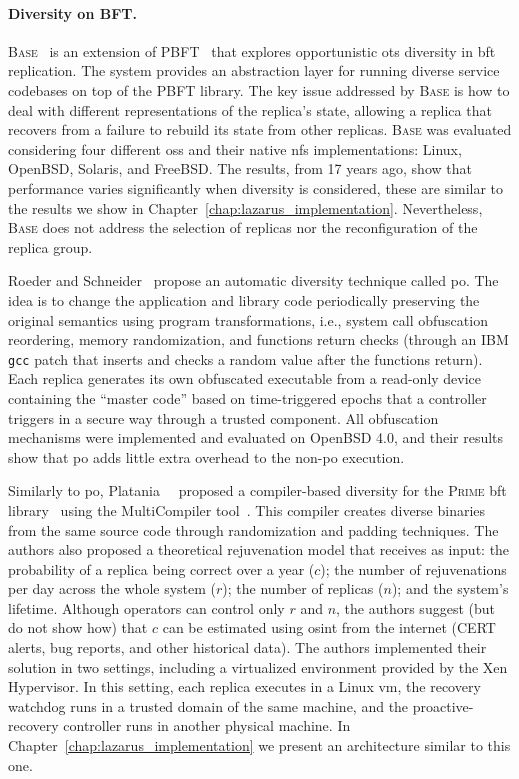 \paragraph{Diversity on BFT.}
\textsc{Base}~\cite{Rodrigues:2001} is an extension of PBFT~\cite{Castro:1999} that explores opportunistic \gls{ots} diversity in \gls{bft} replication. 
The system provides an abstraction layer for running diverse service codebases on top of the PBFT library.
The key issue addressed by \textsc{Base} is how to deal with different representations of the replica's state, allowing a replica that recovers from a failure to rebuild its state from other replicas. 
\textsc{Base} was evaluated considering four different \glspl{os} and their native \gls{nfs} implementations: Linux, OpenBSD, Solaris, and FreeBSD.
The results, from 17 years ago, show that performance varies significantly when diversity is considered, these are similar to the results we show in Chapter~\ref{chap:lazarus_implementation}.
Nevertheless, \textsc{Base} does not address the selection of replicas nor the reconfiguration of the replica group.

Roeder and Schneider~\cite{Roeder:2010} propose an automatic diversity technique called \gls{po}.
The idea is to change the application and library code periodically preserving the original semantics using program transformations, i.e., system call obfuscation reordering, memory randomization, and functions return checks (through an IBM \texttt{gcc} patch that inserts and checks a random value after the functions return).
Each replica generates its own obfuscated executable from a read-only device containing the ``master code'' based on time-triggered epochs that a controller triggers in a secure way through a trusted component.
All obfuscation mechanisms were implemented and evaluated on OpenBSD 4.0, and their results show that \gls{po} adds little extra overhead to the non-\gls{po} execution.

Similarly to \gls{po}, Platania~\etal{}~\cite{Platania:2014} proposed a compiler-based diversity for the \textsc{Prime} \gls{bft} library~\cite{Amir:2011} using the MultiCompiler tool~\cite{Homescu:2013}. 
This compiler creates diverse binaries from the same source code through randomization and padding techniques.
The authors also proposed a theoretical rejuvenation model that receives as input: the probability of a replica being correct over a year ($c$); the number of rejuvenations per day across the whole system ($r$); the number of replicas ($n$); and the system's lifetime. 
Although operators can control only $r$ and $n$, the authors suggest (but do not show how) that $c$ can be estimated using \gls{osint} from the internet (CERT alerts, bug reports, and other historical data).
The authors implemented their solution in two settings, including a virtualized environment provided by the Xen Hypervisor.
In this setting, each replica executes in a Linux \gls{vm}, the recovery watchdog runs in a trusted domain of the same machine, and the proactive-recovery controller runs in another physical machine. In Chapter~\ref{chap:lazarus_implementation} we present an architecture similar to this one.


